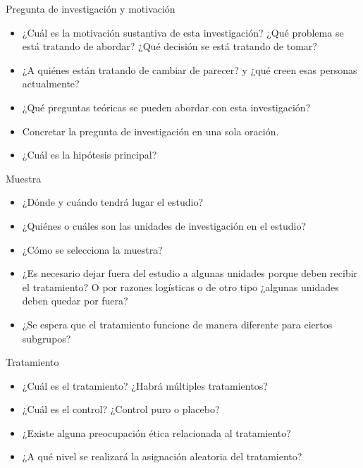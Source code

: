 \documentclass[
  ignorenonframetext,
]{beamer}
\begin{document}
\begin{frame}{Pregunta de investigación y motivación}
\protect\hypertarget{pregunta-de-investigaciuxf3n-y-motivaciuxf3n}{}
\begin{itemize}
\item
  ¿Cuál es la motivación sustantiva de esta investigación? ¿Qué problema
  se está tratando de abordar? ¿Qué decisión se está tratando de tomar?
\item
  ¿A quiénes están tratando de cambiar de parecer? y ¿qué creen esas
  personas actualmente?
\item
  ¿Qué preguntas teóricas se pueden abordar con esta investigación?
\item
  Concretar la pregunta de investigación en una sola oración.
\item
  ¿Cuál es la hipótesis principal?
\end{itemize}
\end{frame}

\begin{frame}{Muestra}
\protect\hypertarget{muestra}{}
\begin{itemize}
\item
  ¿Dónde y cuándo tendrá lugar el estudio?
\item
  ¿Quiénes o cuáles son las unidades de investigación en el estudio?
\item
  ¿Cómo se selecciona la muestra?
\item
  ¿Es necesario dejar fuera del estudio a algunas unidades porque deben
  recibir el tratamiento? O por razones logísticas o de otro tipo
  ¿algunas unidades deben quedar por fuera?
\item
  ¿Se espera que el tratamiento funcione de manera diferente para
  ciertos subgrupos?
\end{itemize}
\end{frame}

\begin{frame}{Tratamiento}
\protect\hypertarget{tratamiento}{}
\begin{itemize}
\item
  ¿Cuál es el tratamiento? ¿Habrá múltiples tratamientos?
\item
  ¿Cuál es el control? ¿Control puro o placebo?
\item
  ¿Existe alguna preocupación ética relacionada al tratamiento?
\item
  ¿A qué nivel se realizará la asignación aleatoria del tratamiento?
\end{itemize}
\end{frame}
\end{document}
